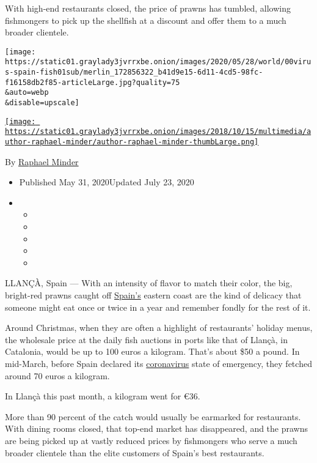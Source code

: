 With high-end restaurants closed, the price of prawns has tumbled,
allowing fishmongers to pick up the shellfish at a discount and offer
them to a much broader clientele.

\texttt{[image: https://static01.graylady3jvrrxbe.onion/images/2020/05/28/world/00virus-spain-fish01sub/merlin\_172856322\_b41d9e15-6d11-4cd5-98fc-f16158db2f85-articleLarge.jpg?quality=75\\\&auto=webp\\\&disable=upscale]}

\href{https://www.nytimes3xbfgragh.onion/by/raphael-minder}{\texttt{[image: https://static01.graylady3jvrrxbe.onion/images/2018/10/15/multimedia/author-raphael-minder/author-raphael-minder-thumbLarge.png]}}

By \href{https://www.nytimes3xbfgragh.onion/by/raphael-minder}{Raphael
Minder}

\begin{itemize}
\item
  Published May 31, 2020Updated July 23, 2020
\item
  \begin{itemize}
  \item
  \item
  \item
  \item
  \item
  \end{itemize}
\end{itemize}

LLANÇÀ, Spain --- With an intensity of flavor to match their color, the
big, bright-red prawns caught off
\href{https://www.nytimes3xbfgragh.onion/2020/07/23/world/europe/spain-coronavirus-reopening.html}{Spain's}
eastern coast are the kind of delicacy that someone might eat once or
twice in a year and remember fondly for the rest of it.

Around Christmas, when they are often a highlight of restaurants'
holiday menus, the wholesale price at the daily fish auctions in ports
like that of Llançà, in Catalonia, would be up to 100 euros a kilogram.
That's about \$50 a pound. In mid-March, before Spain declared its
\href{https://www.nytimes3xbfgragh.onion/2020/07/23/world/europe/spain-coronavirus-reopening.html}{coronavirus}
state of emergency, they fetched around 70 euros a kilogram.

In Llançà this past month, a kilogram went for €36.

More than 90 percent of the catch would usually be earmarked for
restaurants. With dining rooms closed, that top-end market has
disappeared, and the prawns are being picked up at vastly reduced prices
by fishmongers who serve a much broader clientele than the elite
customers of Spain's best restaurants.

